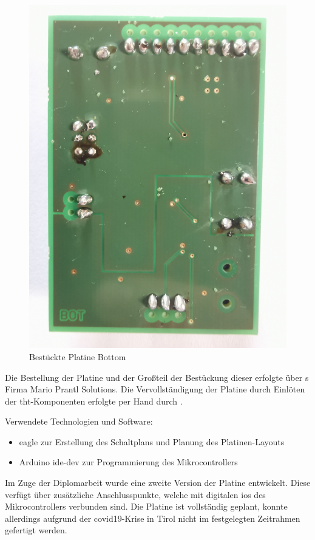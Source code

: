 \begin{center}
\begin{minipage}[t]{0.475\linewidth}
\begin{figure}[H]
			\includegraphics[width=\textwidth]{images/projektergebnis/platineV1bot.jpg}
			\caption{Bestückte Platine Bottom}
		\end{figure}
	\end{minipage}
\end{center}

Die Bestellung der Platine und der Großteil der Bestückung dieser erfolgte über \MarioPrantl s Firma Mario Prantl Solutions.
Die Vervollständigung der Platine durch Einlöten der \ac{tht}-Komponenten erfolgte per Hand durch \MatthiasMair.

Verwendete Technologien und Software:
\begin{itemize}
    \item \ac{eagle} zur Erstellung des Schaltplans und Planung des Platinen-Layouts
    \item Arduino \ac{ide-dev} zur Programmierung des Mikrocontrollers
\end{itemize}

Im Zuge der Diplomarbeit wurde eine zweite Version der Platine entwickelt.
Diese verfügt über zusätzliche Anschlusspunkte, welche mit digitalen \acp{io} des Mikrocontrollers verbunden sind.
Die Platine ist vollständig geplant, konnte allerdings aufgrund der \ac{covid19}-Krise in Tirol nicht im festgelegten Zeitrahmen gefertigt werden.